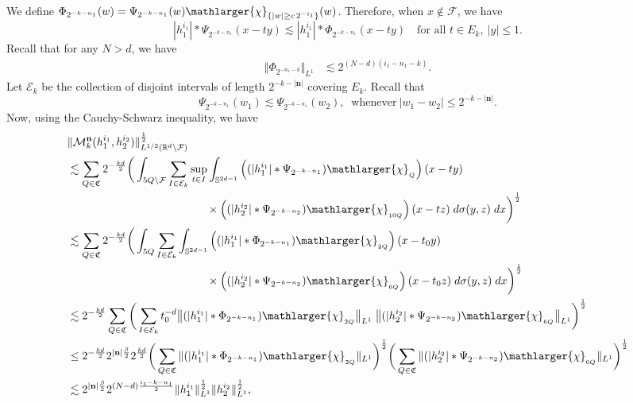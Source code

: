\documentclass[a4paper,reqno]{amsart}
\numberwithin{equation}{section}
\begin{document}
	We define $\Phi_{2^{-k-n_1}}(w)=\Psi_{2^{-k-n_1}}(w)\mathlarger{\chi}_{\{|w|\geq c\,2^{-i_1}\}}(w)$. Therefore, when $x\notin \mathcal{F}$, we have
	\[|h^{i_1}_1|*\Psi_{2^{-k-n_1}}(x-ty)\lesssim|h^{i_1}_1|*\Phi_{2^{-k-n_1}}(x-ty)\quad \text{for all }t\in E_k,~ |y|\leq1.\]
	Recall that for any $N>d$, we have
	\begin{align*}
		\Vert \Phi_{2^{-n_1-k}}\Vert_{L^1}&\lesssim 2^{(N-d)(i_1-n_1-k)}.
	\end{align*}
	Let $\mathcal{E}_k$ be the collection of disjoint intervals of length $2^{-k-|\mathbf{n}|}$ covering $E_k$. Recall that \[\Psi_{2^{-k-n_1}}(w_1)\lesssim\Psi_{2^{-k-n_1}}(w_2),~\text{ whenever}~ |w_1-w_2|\leq2^{-k-|\mathbf{n}|}.\]
	Now, using the Cauchy-Schwarz inequality, we have
	\begin{align*}
		&\|\mathcal{M}^{\mathbf{n}}_k(h^{i_1}_1,h^{i_2}_2)\|_{L^{1/2}(\mathbb{R}^{d}\setminus\mathcal{F})}^\frac{1}{2}\\
		&\lesssim\sum_{Q\in\mathfrak{C}}2^{-\frac{kd}{2}}\bigg(\int_{5Q\setminus\mathcal{F}}\sum_{I\in\mathcal{E}_k}\sup_{t\in I}\int_{\mathbb S^{2d-1}}\left((|h^{i_1}_1|*\Psi_{2^{-k-n_1}})\mathlarger{\chi}_{_{Q}}\right)(x-ty)\\
		&\hspace{4.4cm}\times\left(( |h^{i_2}_2|*\Psi_{2^{-k-n_2}})\mathlarger{\chi}_{_{10Q}}\right)(x-tz)\;d\sigma(y,z)\;dx\bigg)^\frac{1}{2}\\
		&\lesssim\sum_{Q\in\mathfrak{C}}2^{-\frac{kd}{2}}\bigg(\int_{5Q}\sum_{I\in\mathcal{E}_k}\int_{\mathbb S^{2d-1}}\left((|h^{i_1}_1|*\Phi_{2^{-k-n_1}})\mathlarger{\chi}_{_{2Q}}\right)(x-t_0y)\\
		&\hspace{4.4cm}\times\left(( |h^{i_2}_2|*\Psi_{2^{-k-n_2}})\mathlarger{\chi}_{_{6Q}}\right)(x-t_0z)\;d\sigma(y,z)\;dx\bigg)^\frac{1}{2}\\
		&\lesssim2^{-\frac{kd}{2}}\sum_{Q\in\mathfrak{C}}\bigg(\sum_{I\in\mathcal{E}_k}t_0^{-d}\big\|(|h^{i_1}_1|*\Phi_{2^{-k-n_1}})\mathlarger{\chi}_{_{2Q}}\big\|_{L^1}\;\big\|( |h^{i_2}_2|*\Psi_{2^{-k-n_2}})\mathlarger{\chi}_{_{6Q}}\big\|_{L^1}\bigg)^\frac{1}{2}\\
		&\leq2^{-\frac{kd}{2}}2^{|\mathbf{n}|\frac{\beta}{2}}2^{\frac{kd}{2}}\bigg(\sum_{Q\in\mathfrak{C}}\|(|h^{i_1}_1|*\Phi_{2^{-k-n_1}})\mathlarger{\chi}_{_{2Q}}\|_{L^1}\bigg)^\frac{1}{2}\bigg(\sum_{Q\in\mathfrak{C}}\|(|h^{i_2}_2|*\Psi_{2^{-k-n_2}})\mathlarger{\chi}_{_{6Q}}\|_{L^1}\bigg)^\frac{1}{2}\\
		&\lesssim2^{|\mathbf{n}|\frac{\beta}{2}}2^{(N-d)\frac{i_1-k-n_1}{2}}\|h^{i_1}_{1}\|_{L^1}^\frac{1}{2}\|h^{i_2}_2\|_{L^1}^\frac{1}{2},
	\end{align*}
\end{document}

